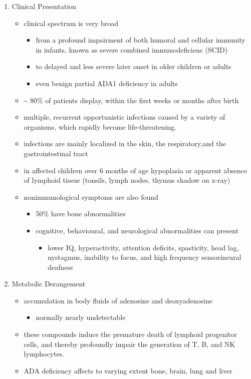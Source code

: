 \documentclass{scrartcl}
\begin{document}
\begin{enumerate}
\item Clinical Presentation
\label{sec:org89e4f19}
\begin{itemize}
\item clinical spectrum is very broad
\begin{itemize}
\item from a profound impairment of both humoral and cellular immunity
in infants, known as severe combined immunodeficienc (SCID)
\item to delayed and less severe later onset in older children or
adults
\item even benign partial ADA1 deficiency in adults
\end{itemize}
\item \textasciitilde{} 80\% of patients display, within the first weeks or months after
birth
\item multiple, recurrent opportunistic infections caused by a variety of
organisms, which rapidly become life-threatening.
\item infections are mainly localized in the skin, the respiratory,and the
gastrointestinal tract
\item in affected children over 6 months of age hypoplasia or apparent
absence of lymphoid tissue (tonsils, lymph nodes, thymus shadow on x-ray)
\item nonimmunological symptoms are also found
\begin{itemize}
\item 50\% have bone abnormalities
\item cognitive, behavioural, and neurological abnormalities can present
\begin{itemize}
\item lower IQ, hyperactivity, attention deficits, spasticity, head
lag, nystagmus, inability to focus, and high frequency
sensorineural deafness
\end{itemize}
\end{itemize}
\end{itemize}

\item Metabolic Derangement
\label{sec:orge38d7f5}
\begin{itemize}
\item accumulation in body fluids of adenosine and deoxyadenosine
\begin{itemize}
\item normally nearly undetectable
\end{itemize}
\item these compounds induce the premature death of lymphoid progenitor
cells, and thereby profoundly impair the generation of T, B, and NK
lymphocytes.
\item ADA deficiency affects to varying extent bone, brain, lung and liver
\end{itemize}


\end{enumerate}
\end{document}
